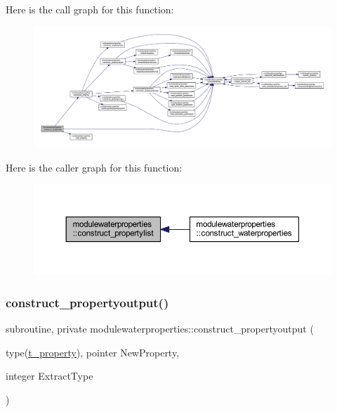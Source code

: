 Here is the call graph for this function\+:\nopagebreak
\begin{figure}[H]
\begin{center}
\leavevmode
\includegraphics[width=350pt]{namespacemodulewaterproperties_a4eb6420a0cc772838269f9aed6c4394e_cgraph}
\end{center}
\end{figure}
Here is the caller graph for this function\+:\nopagebreak
\begin{figure}[H]
\begin{center}
\leavevmode
\includegraphics[width=350pt]{namespacemodulewaterproperties_a4eb6420a0cc772838269f9aed6c4394e_icgraph}
\end{center}
\end{figure}
\mbox{\label{namespacemodulewaterproperties_a37e8798b8bd2e4c33eff80dd151d0d31}} 
\subsubsection{\texorpdfstring{construct\+\_\+propertyoutput()}{construct\_propertyoutput()}}
{\footnotesize\ttfamily subroutine, private modulewaterproperties\+::construct\+\_\+propertyoutput (\begin{DoxyParamCaption}\item[{type(\mbox{\hyperlink{structmodulewaterproperties_1_1t__property}{t\+\_\+property}}), pointer}]{New\+Property,  }\item[{integer}]{Extract\+Type }\end{DoxyParamCaption})\hspace{0.3cm}{\ttfamily [private]}}

